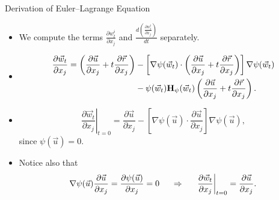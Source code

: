 \documentclass{beamer}
\begin{document}
\begin{frame}{Derivation of Euler--Lagrange Equation}
  \begin{itemize}
  \item We compute the terms $\frac{\partial w^i_t}{\partial x_j}$ and $\frac{d\left(\frac{\partial w^i_t}{\partial x_j}\right)}{d t}$ separately.
\item \begin{align*}
\frac{\partial \vec{w}_t}{\partial x_j} = \left( \frac{\partial \vec{u}}{\partial x_j} + t \frac{\partial \vec{r}}{\partial x_j}\right) &- \left[ \nabla \psi(\vec{w}_t) \cdot \left( \frac{\partial \vec{u}}{\partial x_j} + t \frac{\partial \vec{r}}{\partial x_j}\right) \right] \nabla \psi(\vec{w}_t)\\
& - \psi(\vec{w}_t) {\bf H}_{\psi} (\vec{w}_t) \left( \frac{\partial \vec{u}}{\partial x_j} + t \frac{\partial \vec{r}}{\partial x_j}\right).
\end{align*}
\item \begin{equation}
\left.\frac{\partial \vec{w}_t}{\partial x_j}\right\vert_{t=0} = \frac{\partial \vec{u}}{\partial x_j} - \left[ \nabla \psi(\vec{u}) \cdot  \frac{\partial \vec{u}}{\partial x_j}  \right] \nabla \psi(\vec{u}),
\end{equation}
since $\psi (\vec{u}) = 0.$
\item Notice also that $$\nabla \psi (\vec{u}) \frac{\partial \vec{u}}{\partial x_j} = \frac{\partial \psi(\vec{u})}{\partial x_j} =0\hspace{0.5cm}\Rightarrow \hspace{0.5cm} \left.\frac{\partial \vec{w}_t}{\partial x_j}\right\vert_{t=0}= \frac{\partial \vec{u}}{\partial x_j}.$$
  \end{itemize}
\end{frame}
\end{document}
